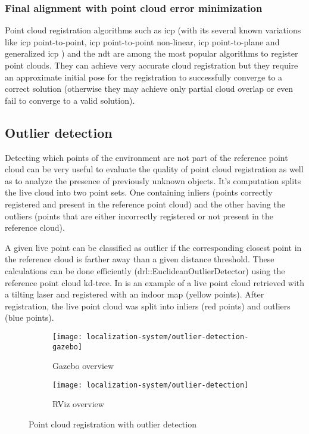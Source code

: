 \subsubsection{Final alignment with point cloud error minimization}

Point cloud registration algorithms such as \gls{icp} \cite{Besl1992a} (with its several known variations \cite{Rusinkiewicz2001,Pomerleau2013} like \gls{icp} point-to-point, \gls{icp} point-to-point non-linear, \gls{icp} point-to-plane and generalized \gls{icp} \cite{Segal2009}) and the \gls{ndt} \cite{Magnusson2009} are among the most popular algorithms to register point clouds. They can achieve very accurate cloud registration but they require an approximate initial pose for the registration to successfully converge to a correct solution (otherwise they may achieve only partial cloud overlap or even fail to converge to a valid solution).


\subsection{Outlier detection}

Detecting which points of the environment are not part of the reference point cloud can be very useful to evaluate the quality of point cloud registration as well as to analyze the presence of previously unknown objects. It's computation splits the live cloud into two point sets. One containing inliers (points correctly registered and present in the reference point cloud) and the other having the outliers (points that are either incorrectly registered or not present in the reference cloud).

A given live point can be classified as outlier if the corresponding closest point in the reference cloud is farther away than a given distance threshold. These calculations can be done efficiently (drl::EuclideanOutlierDetector) using the reference point cloud kd-tree. In  is an example of a live point cloud retrieved with a tilting laser and registered with an indoor map (yellow points). After registration, the live point cloud was split into inliers (red points) and outliers (blue points).


\begin{figure}
	\centering
	\begin{subfigure}[ht]{0.35\textwidth}
		\centering
		\texttt{[image: localization-system/outlier-detection-gazebo]}
		\caption{Gazebo overview}
	\end{subfigure}
	\begin{subfigure}[ht]{0.35\textwidth}
		\centering
		\texttt{[image: localization-system/outlier-detection]}
		\caption{RViz overview}
	\end{subfigure}\hfill
	\caption{Point cloud registration with outlier detection}
	\label{fig:localization-system_outlier-detection}
\end{figure}


